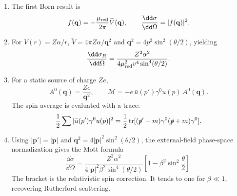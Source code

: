 \begin{enumerate}
\begin{enumerate}
\item
The first Born result is
\[
 f(\mathbf q)=-\frac{\mu_{\rm red}}{2\pi}\widetilde V(\mathbf q),
\qquad \frac{\dd\sigma}{\dd\Omega}=|f(\mathbf q)|^2.
\]
\item
For \(V(r)=Z\alpha/r\),
\(\widetilde V=4\pi Z\alpha/\mathbf q^2\) and
\(\mathbf q^2=4p^2\sin^2(\theta/2)\), yielding
\[
 \frac{\dd\sigma_R}{\dd\Omega}
 =\frac{Z^2\alpha^2}
 {4\mu_{\rm red}^2v^4\sin^4(\theta/2)}.
\]
\item
For a static source of charge \(Ze\),
\[
 A^0(\mathbf q)=\frac{Ze}{\mathbf q^2},\qquad
 \mathcal M=-e\,\bar u(p')\gamma^0u(p)\,A^0(\mathbf q).
\]
The spin average is evaluated with a trace:
\[
 \frac12\sum|\bar u(p')\gamma^0u(p)|^2
 =\frac12\operatorname{tr}
 [(\slashed p'+m)\gamma^0(\slashed p+m)\gamma^0].
\]
\item
Using \(|\mathbf p'|=|\mathbf p|\) and
\(\mathbf q^2=4|\mathbf p|^2\sin^2(\theta/2)\), the external-field
phase-space normalization gives the Mott formula
\[
 \boxed{\;
 \frac{\dd\sigma}{\dd\Omega}
 =\frac{Z^2\alpha^2}
 {4|\mathbf p|^2\beta^2\sin^4(\theta/2)}
 \left[1-\beta^2\sin^2\frac\theta2\right].\;}
\]
The bracket is the relativistic spin correction.  It tends to one for
\(\beta\ll1\), recovering Rutherford scattering.
\end{enumerate}


\end{enumerate}
